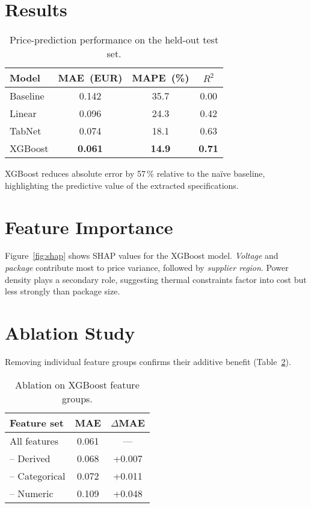 \section{Results}
\begin{table}[H]
\centering
\caption{Price-prediction performance on the held-out test set.}
\label{tab:cost}
\begin{tabular}{lccc}
\toprule
Model & MAE~(EUR) & MAPE~(\%) & $R^{2}$ \\
\midrule
Baseline  & 0.142 & 35.7 & 0.00 \\
Linear    & 0.096 & 24.3 & 0.42 \\
TabNet    & 0.074 & 18.1 & 0.63 \\
XGBoost   & \textbf{0.061} & \textbf{14.9} & \textbf{0.71} \\
\bottomrule
\end{tabular}
\end{table}
XGBoost reduces absolute error by 57\,\% relative to the naïve baseline, highlighting the predictive value of the extracted specifications.

\section{Feature Importance}
Figure~\ref{fig:shap} shows SHAP values for the XGBoost model.  \textit{Voltage} and \textit{package} contribute most to price variance, followed by \textit{supplier region}.  Power density plays a secondary role, suggesting thermal constraints factor into cost but less strongly than package size.

\section{Ablation Study}
Removing individual feature groups confirms their additive benefit (Table~\ref{tab:ablation-cost}).

\begin{table}[H]
\centering
\caption{Ablation on XGBoost feature groups.}
\label{tab:ablation-cost}
\begin{tabular}{lcc}
\toprule
Feature set & MAE & $\Delta$MAE \\
\midrule
All features & 0.061 & --- \\
-- Derived    & 0.068 & +0.007 \\
-- Categorical & 0.072 & +0.011 \\
-- Numeric     & 0.109 & +0.048 \\
\bottomrule
\end{tabular}
\end{table}

